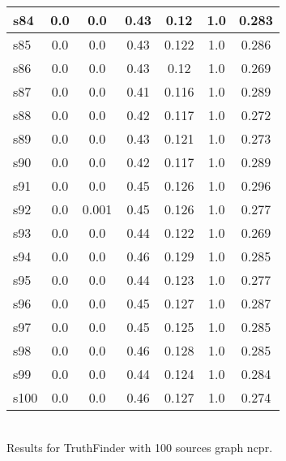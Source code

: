 \documentclass{article}
\begin{document}
\begin{tabular}{|l|c|c|c|c|c|c|}
\hline
s84 &0.0 & 0.0 & 0.43 & 0.12 & 1.0 & 0.283\\
\hline
s85 &0.0 & 0.0 & 0.43 & 0.122 & 1.0 & 0.286\\
\hline
s86 &0.0 & 0.0 & 0.43 & 0.12 & 1.0 & 0.269\\
\hline
s87 &0.0 & 0.0 & 0.41 & 0.116 & 1.0 & 0.289\\
\hline
s88 &0.0 & 0.0 & 0.42 & 0.117 & 1.0 & 0.272\\
\hline
s89 &0.0 & 0.0 & 0.43 & 0.121 & 1.0 & 0.273\\
\hline
s90 &0.0 & 0.0 & 0.42 & 0.117 & 1.0 & 0.289\\
\hline
s91 &0.0 & 0.0 & 0.45 & 0.126 & 1.0 & 0.296\\
\hline
s92 &0.0 & 0.001 & 0.45 & 0.126 & 1.0 & 0.277\\
\hline
s93 &0.0 & 0.0 & 0.44 & 0.122 & 1.0 & 0.269\\
\hline
s94 &0.0 & 0.0 & 0.46 & 0.129 & 1.0 & 0.285\\
\hline
s95 &0.0 & 0.0 & 0.44 & 0.123 & 1.0 & 0.277\\
\hline
s96 &0.0 & 0.0 & 0.45 & 0.127 & 1.0 & 0.287\\
\hline
s97 &0.0 & 0.0 & 0.45 & 0.125 & 1.0 & 0.285\\
\hline
s98 &0.0 & 0.0 & 0.46 & 0.128 & 1.0 & 0.285\\
\hline
s99 &0.0 & 0.0 & 0.44 & 0.124 & 1.0 & 0.284\\
\hline
s100 &0.0 & 0.0 & 0.46 & 0.127 & 1.0 & 0.274\\
\hline
\end{tabular}\\

\noindent Results for TruthFinder with 100 sources graph ncpr.
\end{document}
